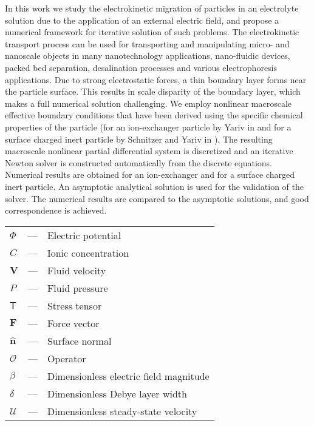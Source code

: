 \documentclass[MSc,beforeExam]{iitcsthesis}
\newcommand\bV{\boldsymbol{V}}
\newcommand\bF{\boldsymbol{F}}
\newcommand\bnhat{\hat{\boldsymbol{n}}}
\newcommand\cO{\mathcal{O}}
\newcommand\cU{\mathscr{U}}
\newcommand\tT{\mathsf{T}}
\begin{document}





\maketitleEnglish

\abstractEnglish
In this work we study the electrokinetic 
migration of particles in an electrolyte solution 
due to the application of an external electric field,
and propose a numerical framework for iterative solution of such problems.
The electrokinetic transport process can be used for
transporting and manipulating micro- and nanoscale objects in 
many nanotechnology applications, nano-fluidic devices, packed bed separation, 
desalination processes and various electrophoresis applications.
Due to strong electrostatic forces, a thin boundary layer forms near the particle
surface. This results in scale disparity of the boundary layer, which makes a 
full numerical solution challenging. 
We employ nonlinear macroscale effective boundary conditions that have been derived
using the specific chemical properties of the particle
(for an ion-exchanger particle by Yariv in \cite{yariv2010migration}
and for a surface charged inert particle by Schnitzer and Yariv in \cite{schnitzer2012surface}).
The resulting macroscale nonlinear partial differential system 
is discretized and an iterative Newton solver is
constructed automatically from the discrete equations.
Numerical results are obtained for an ion-exchanger and 
for a surface charged inert particle. 
An asymptotic analytical solution is 
used for the validation of the solver. 
The numerical results are compared to the asymptotic solutions, 
and good correspondence is achieved.

\abbreviationsAndNotationsEnglish

\begin{longtable}{lcl}
$\varPhi$ 	& --- & Electric potential \\
$C$ 		& --- & Ionic concentration \\
$\bV$		& --- & Fluid velocity \\
$P$			& --- & Fluid pressure \\
$\tT$		& --- & Stress tensor \\
$\bF$		& --- & Force vector \\
$\bnhat$	& --- & Surface normal \\
$\cO$ 		& --- & Operator \\
$\beta$		& --- & Dimensionless electric field magnitude \\
$\delta$	& --- & Dimensionless Debye layer width \\
$\cU$		& --- & Dimensionless steady-state velocity 
\end{longtable}
\end{document}
